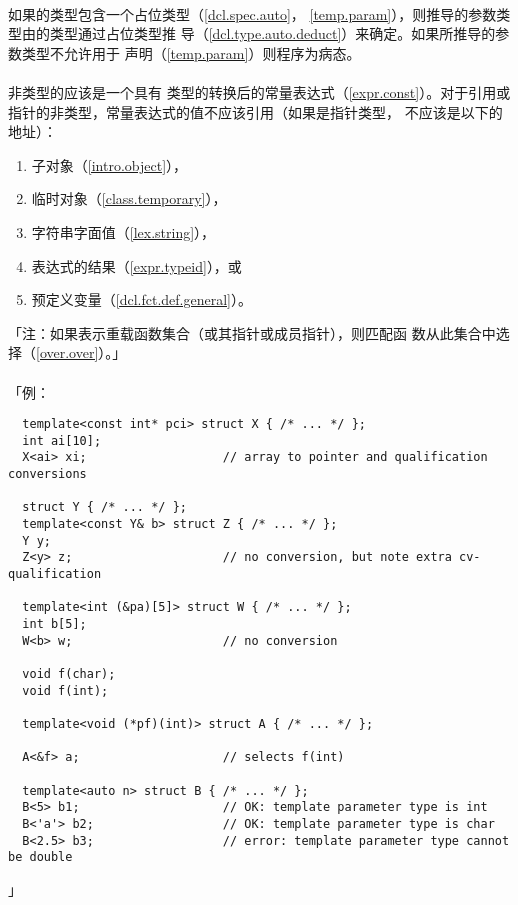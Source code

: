 \paragraph{}
如果的类型包含一个占位类型（\ref{dcl.spec.auto}，
\ref{temp.param}），则推导的参数类型由的类型通过占位类型推
导（\ref{dcl.type.auto.deduct}）来确定。如果所推导的参数类型不允许用于
声明（\ref{temp.param}）则程序为病态。

\paragraph{}
非类型的应该是一个具有
类型的转换后的常量表达式（\ref{expr.const}）。对于引用或
指针的非类型，常量表达式的值不应该引用（如果是指针类型，
不应该是以下的地址）：
\begin{enumerate}
  \item{子对象（\ref{intro.object}），}
  \item{临时对象（\ref{class.temporary}），}
  \item{字符串字面值（\ref{lex.string}），}
  \item{表达式的结果（\ref{expr.typeid}），或}
  \item{预定义变量（\ref{dcl.fct.def.general}）。}
\end{enumerate}
「注：如果表示重载函数集合（或其指针或成员指针），则匹配函
数从此集合中选择（\ref{over.over}）。」

\paragraph{}
「例：
\begin{lstlisting}
  template<const int* pci> struct X { /* ... */ };
  int ai[10];
  X<ai> xi;                   // array to pointer and qualification conversions

  struct Y { /* ... */ };
  template<const Y& b> struct Z { /* ... */ };
  Y y;
  Z<y> z;                     // no conversion, but note extra cv-qualification

  template<int (&pa)[5]> struct W { /* ... */ };
  int b[5];
  W<b> w;                     // no conversion

  void f(char);
  void f(int);

  template<void (*pf)(int)> struct A { /* ... */ };

  A<&f> a;                    // selects f(int)

  template<auto n> struct B { /* ... */ };
  B<5> b1;                    // OK: template parameter type is int
  B<'a'> b2;                  // OK: template parameter type is char
  B<2.5> b3;                  // error: template parameter type cannot be double
\end{lstlisting}」

